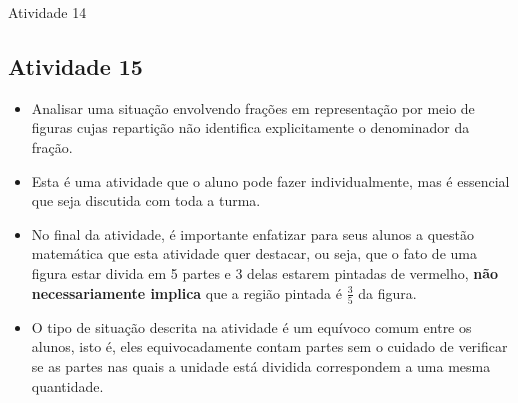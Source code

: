\begin{multicols}{2}
\begin{resposta*}{Atividade 14}
\begin{center}
  \end{center}

  \end{resposta*}



\subsection{Atividade 15}




  \vspace{.1cm}

  \begin{itemize} %
    \item       Analisar uma situação envolvendo frações em representação por meio de figuras cujas repartição não identifica explicitamente o denominador da fração.
\end{itemize} %


  \vspace{.1cm}

  \vspace{.1cm}

\begin{itemize} %
    \item       Esta é uma atividade que o aluno pode fazer individualmente, mas é essencial que seja discutida com toda a turma.
    \item       No final da atividade, é importante enfatizar para seus alunos a questão matemática que esta atividade quer destacar, ou seja, que o fato de uma figura estar divida em 5 partes e 3 delas estarem pintadas de vermelho,       {\bf não necessariamente implica}       que a região pintada é       $\frac{3}{5}$ da figura.
    \item       O tipo de situação descrita na atividade é um equívoco comum entre os alunos, isto é, eles equivocadamente contam partes sem o cuidado de verificar se as partes nas quais a unidade está dividida correspondem a uma mesma quantidade.
\end{itemize} %


  \vspace{.1cm}





\end{multicols}
